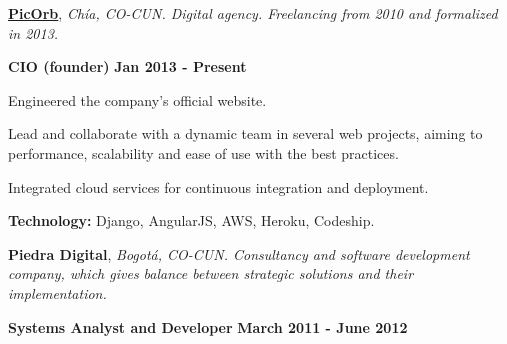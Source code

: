 

\href{http://www.picorb.com/}{\textbf{PicOrb}}, \textit{Ch\'ia, CO-CUN.
Digital agency. Freelancing from 2010 and formalized in
2013.}

\begin{outerlist}
\item[\FA \faAngleDoubleRight] \textbf{CIO (founder)} \hfill \textbf{Jan 2013 -
Present}
\end{outerlist}

    \begin{innerlist}
\item Engineered the company's official website.
\item Lead and collaborate with a dynamic team in several
web projects, aiming to performance, scalability and ease of use with
the best practices.
\item Integrated cloud services for continuous integration and
deployment.
\item \textbf{Technology:} Django, AngularJS, AWS, Heroku, Codeship.
    \end{innerlist}

\quarterblankline

\textbf{Piedra Digital},
\textit{Bogot\'a, CO-CUN. Consultancy and software development
company, which gives balance between strategic solutions and their implementation.}

\begin{outerlist}
\item[\FA \faAngleDoubleRight] \textbf{Systems Analyst and Developer} \hfill
\textbf{March 2011 - June 2012}
\end{outerlist}

